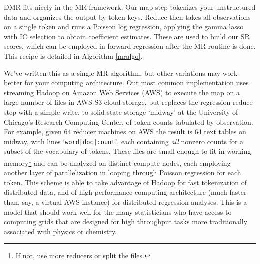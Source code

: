 \documentclass[12pt]{article}
\newcommand{\sgl}{\setstretch{1.1}}
\newcommand{\bs}[1]{\boldsymbol{#1}}
\newcommand{\bm}[1]{\mathbf{#1}}
\newcommand{\cd}[1]{{\tt#1}}
\begin{document}
DMR fits nicely in the MR framework.  Our map step tokenizes your unstructured data  and organizes the output by token keys.  Reduce then takes all observations on a single token and runs a Poisson log regression, applying the gamma lasso with IC selection to obtain coefficient estimates.  These are used to build our SR scores, which can be employed in forward regression after the MR routine is done.  This recipe is detailed in Algorithm \ref{mralgo}.




We've written this as a single MR algorithm, but other variations may work better for your computing architecture. Our most common implementation uses streaming Hadoop on Amazon Web Services (AWS) to execute the map on a large number of files in AWS S3 cloud storage, but replaces the regression reduce step with a simple write, to solid state storage `midway' at the University of Chicago's Research Computing Center, of token counts tabulated by observation.  For example, given 64 reducer machines on AWS the result is 64 text tables on midway, with lines `\cd{word|doc|count}', each containing {\it all} nonzero counts for a subset of the vocabulary of tokens.  These files are small enough to fit in working memory\footnote{If not, use more reducers or split the files.} and can be analyzed on distinct compute nodes, each employing another layer of parallelization in looping through Poisson regression for each token.  This scheme is able to take advantage of Hadoop for fast tokenization of distributed data, and of
high performance computing architecture (much faster than, say, a virtual AWS instance) for distributed  regression analyses.  This is a model that should work well for the many statisticians who have access to computing grids that are designed for high throughput tasks more traditionally associated with physics or chemistry.

\sgl\small


\end{document}
